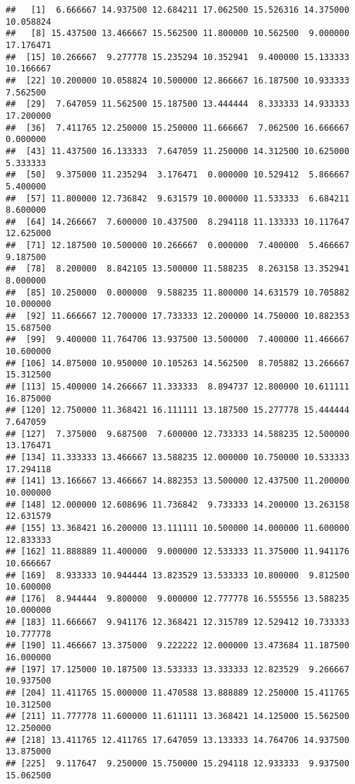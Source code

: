 \documentclass[
]{article}
\begin{document}
\begin{verbatim}
##   [1]  6.666667 14.937500 12.684211 17.062500 15.526316 14.375000 10.058824
##   [8] 15.437500 13.466667 15.562500 11.800000 10.562500  9.000000 17.176471
##  [15] 10.266667  9.277778 15.235294 10.352941  9.400000 15.133333 10.166667
##  [22] 10.200000 10.058824 10.500000 12.866667 16.187500 10.933333  7.562500
##  [29]  7.647059 11.562500 15.187500 13.444444  8.333333 14.933333 17.200000
##  [36]  7.411765 12.250000 15.250000 11.666667  7.062500 16.666667  0.000000
##  [43] 11.437500 16.133333  7.647059 11.250000 14.312500 10.625000  5.333333
##  [50]  9.375000 11.235294  3.176471  0.000000 10.529412  5.866667  5.400000
##  [57] 11.800000 12.736842  9.631579 10.000000 11.533333  6.684211  8.600000
##  [64] 14.266667  7.600000 10.437500  8.294118 11.133333 10.117647 12.625000
##  [71] 12.187500 10.500000 10.266667  0.000000  7.400000  5.466667  9.187500
##  [78]  8.200000  8.842105 13.500000 11.588235  8.263158 13.352941  8.000000
##  [85] 10.250000  0.000000  9.588235 11.800000 14.631579 10.705882 10.000000
##  [92] 11.666667 12.700000 17.733333 12.200000 14.750000 10.882353 15.687500
##  [99]  9.400000 11.764706 13.937500 13.500000  7.400000 11.466667 10.600000
## [106] 14.875000 10.950000 10.105263 14.562500  8.705882 13.266667 15.312500
## [113] 15.400000 14.266667 11.333333  8.894737 12.800000 10.611111 16.875000
## [120] 12.750000 11.368421 16.111111 13.187500 15.277778 15.444444  7.647059
## [127]  7.375000  9.687500  7.600000 12.733333 14.588235 12.500000 13.176471
## [134] 11.333333 13.466667 13.588235 12.000000 10.750000 10.533333 17.294118
## [141] 13.166667 13.466667 14.882353 13.500000 12.437500 11.200000 10.000000
## [148] 12.000000 12.608696 11.736842  9.733333 14.200000 13.263158 12.631579
## [155] 13.368421 16.200000 13.111111 10.500000 14.000000 11.600000 12.833333
## [162] 11.888889 11.400000  9.000000 12.533333 11.375000 11.941176 10.666667
## [169]  8.933333 10.944444 13.823529 13.533333 10.800000  9.812500 10.600000
## [176]  8.944444  9.800000  9.000000 12.777778 16.555556 13.588235 10.000000
## [183] 11.666667  9.941176 12.368421 12.315789 12.529412 10.733333 10.777778
## [190] 11.466667 13.375000  9.222222 12.000000 13.473684 11.187500 16.000000
## [197] 17.125000 10.187500 13.533333 13.333333 12.823529  9.266667 10.937500
## [204] 11.411765 15.000000 11.470588 13.888889 12.250000 15.411765 10.312500
## [211] 11.777778 11.600000 11.611111 13.368421 14.125000 15.562500 12.250000
## [218] 13.411765 12.411765 17.647059 13.133333 14.764706 14.937500 13.875000
## [225]  9.117647  9.250000 15.750000 15.294118 12.933333  9.937500 15.062500

\end{verbatim}
\end{document}
